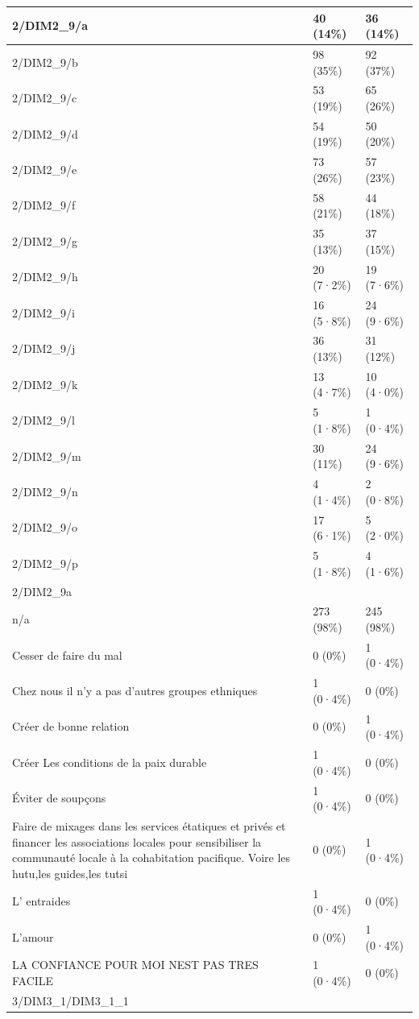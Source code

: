 \documentclass[
]{book}
\begin{document}
\begin{tabular}{l|l|l}
2/DIM2\_9/a & 40 (14\%) & 36 (14\%)\\
\hline
2/DIM2\_9/b & 98 (35\%) & 92 (37\%)\\
\hline
2/DIM2\_9/c & 53 (19\%) & 65 (26\%)\\
\hline
2/DIM2\_9/d & 54 (19\%) & 50 (20\%)\\
\hline
2/DIM2\_9/e & 73 (26\%) & 57 (23\%)\\
\hline
2/DIM2\_9/f & 58 (21\%) & 44 (18\%)\\
\hline
2/DIM2\_9/g & 35 (13\%) & 37 (15\%)\\
\hline
2/DIM2\_9/h & 20 (7·2\%) & 19 (7·6\%)\\
\hline
2/DIM2\_9/i & 16 (5·8\%) & 24 (9·6\%)\\
\hline
2/DIM2\_9/j & 36 (13\%) & 31 (12\%)\\
\hline
2/DIM2\_9/k & 13 (4·7\%) & 10 (4·0\%)\\
\hline
2/DIM2\_9/l & 5 (1·8\%) & 1 (0·4\%)\\
\hline
2/DIM2\_9/m & 30 (11\%) & 24 (9·6\%)\\
\hline
2/DIM2\_9/n & 4 (1·4\%) & 2 (0·8\%)\\
\hline
2/DIM2\_9/o & 17 (6·1\%) & 5 (2·0\%)\\
\hline
2/DIM2\_9/p & 5 (1·8\%) & 4 (1·6\%)\\
\hline
2/DIM2\_9a &  & \\
\hline
n/a & 273 (98\%) & 245 (98\%)\\
\hline
Cesser de faire du mal & 0 (0\%) & 1 (0·4\%)\\
\hline
Chez nous il n'y a pas d'autres groupes ethniques & 1 (0·4\%) & 0 (0\%)\\
\hline
Créer de bonne relation & 0 (0\%) & 1 (0·4\%)\\
\hline
Créer Les conditions de la paix durable & 1 (0·4\%) & 0 (0\%)\\
\hline
Éviter de soupçons & 1 (0·4\%) & 0 (0\%)\\
\hline
Faire de mixages dans les services étatiques et privés et financer les associations locales pour sensibiliser la communauté locale à la cohabitation pacifique. Voire les hutu,les guides,les tutsi & 0 (0\%) & 1 (0·4\%)\\
\hline
L' entraides & 1 (0·4\%) & 0 (0\%)\\
\hline
L'amour & 0 (0\%) & 1 (0·4\%)\\
\hline
LA CONFIANCE POUR MOI NEST PAS TRES FACILE & 1 (0·4\%) & 0 (0\%)\\
\hline
3/DIM3\_1/DIM3\_1\_1 &  & \\

\end{tabular}
\end{document}
